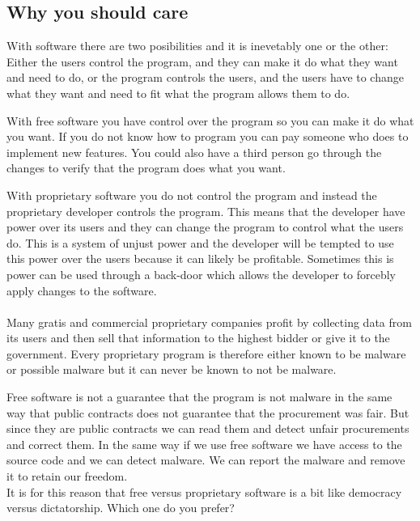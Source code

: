\documentclass[12pt,a4paper]{article}
\begin{document}
\subsection{Why you should care}
With software there are two posibilities and it is inevetably one or the other: Either the users control the program, and they can make it do what they want and need to do, or the program controls the users, and the users have to change what they want and need to fit what the program allows them to do.

With free software you have control over the program so you can make it do what you want. If you do not know how to program you can pay someone who does to implement new features. You could also have a third person go through the changes to verify that the program does what you want.

With proprietary software you do not control the program and instead the proprietary developer controls the program. This means that the developer have power over its users and they can change the program to control what the users do. This is a system of unjust power and the developer will be tempted to use this power over the users because it can likely be profitable. Sometimes this is power can be used through a back-door which allows the developer to forcebly apply changes to the software.
\\\\
Many gratis and commercial proprietary companies profit by collecting data from its users and then sell that information to the highest bidder or give it to the government. Every proprietary program is therefore either known to be malware or possible malware but it can never be known to not be malware.

Free software is not a guarantee that the program is not malware in the same way that public contracts does not guarantee that the procurement was fair. But since they are public contracts we can read them and detect unfair procurements and correct them. In the same way if we use free software we have access to the source code and we can detect malware. We can report the malware and remove it to retain our freedom. \\
It is for this reason that free versus proprietary software is a bit like democracy versus dictatorship. Which one do you prefer?
\end{document}
